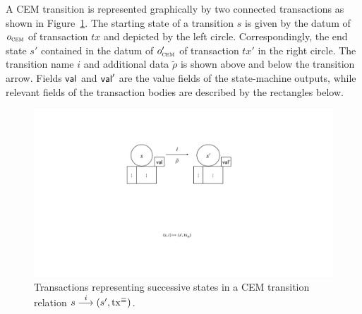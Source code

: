 A CEM transition is represented graphically by two connected transactions as
shown in Figure~\ref{fig:state-transition}. The starting state of a transition
$s$ is given by the datum of $o_{\textsc{cem}}$ of transaction $tx$ and depicted by the
left circle. Correspondingly, the end state $s'$ contained in the datum of
$o_{\textsc{cem}}'$ of transaction $tx'$ in the right circle. The transition name $i$ and
additional data $\tilde \rho$ is shown above and below the transition arrow.
Fields $\mathsf{val}$ and $\mathsf{val}'$ are the value fields of the state-machine outputs,
while relevant fields of the transaction bodies are described by the rectangles
below.

\begin{figure}[h]
	\centering
	\includegraphics[scale=.2,width=\textwidth/2]{figures/state-transition_cropped.pdf}
	\caption{Transactions representing successive states in a CEM
		transition relation \({s}\overset{i}\longrightarrow(s', \mathrm{tx}^\equiv)\).}\label{fig:state-transition}
\end{figure}

